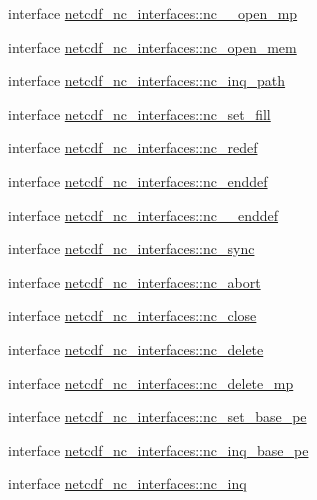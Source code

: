 \begin{DoxyCompactItemize}
\item 
interface \hyperlink{interfacenetcdf__nc__interfaces_1_1nc____open__mp}{netcdf\+\_\+nc\+\_\+interfaces\+::nc\+\_\+\+\_\+open\+\_\+mp}
\item 
interface \hyperlink{interfacenetcdf__nc__interfaces_1_1nc__open__mem}{netcdf\+\_\+nc\+\_\+interfaces\+::nc\+\_\+open\+\_\+mem}
\item 
interface \hyperlink{interfacenetcdf__nc__interfaces_1_1nc__inq__path}{netcdf\+\_\+nc\+\_\+interfaces\+::nc\+\_\+inq\+\_\+path}
\item 
interface \hyperlink{interfacenetcdf__nc__interfaces_1_1nc__set__fill}{netcdf\+\_\+nc\+\_\+interfaces\+::nc\+\_\+set\+\_\+fill}
\item 
interface \hyperlink{interfacenetcdf__nc__interfaces_1_1nc__redef}{netcdf\+\_\+nc\+\_\+interfaces\+::nc\+\_\+redef}
\item 
interface \hyperlink{interfacenetcdf__nc__interfaces_1_1nc__enddef}{netcdf\+\_\+nc\+\_\+interfaces\+::nc\+\_\+enddef}
\item 
interface \hyperlink{interfacenetcdf__nc__interfaces_1_1nc____enddef}{netcdf\+\_\+nc\+\_\+interfaces\+::nc\+\_\+\+\_\+enddef}
\item 
interface \hyperlink{interfacenetcdf__nc__interfaces_1_1nc__sync}{netcdf\+\_\+nc\+\_\+interfaces\+::nc\+\_\+sync}
\item 
interface \hyperlink{interfacenetcdf__nc__interfaces_1_1nc__abort}{netcdf\+\_\+nc\+\_\+interfaces\+::nc\+\_\+abort}
\item 
interface \hyperlink{interfacenetcdf__nc__interfaces_1_1nc__close}{netcdf\+\_\+nc\+\_\+interfaces\+::nc\+\_\+close}
\item 
interface \hyperlink{interfacenetcdf__nc__interfaces_1_1nc__delete}{netcdf\+\_\+nc\+\_\+interfaces\+::nc\+\_\+delete}
\item 
interface \hyperlink{interfacenetcdf__nc__interfaces_1_1nc__delete__mp}{netcdf\+\_\+nc\+\_\+interfaces\+::nc\+\_\+delete\+\_\+mp}
\item 
interface \hyperlink{interfacenetcdf__nc__interfaces_1_1nc__set__base__pe}{netcdf\+\_\+nc\+\_\+interfaces\+::nc\+\_\+set\+\_\+base\+\_\+pe}
\item 
interface \hyperlink{interfacenetcdf__nc__interfaces_1_1nc__inq__base__pe}{netcdf\+\_\+nc\+\_\+interfaces\+::nc\+\_\+inq\+\_\+base\+\_\+pe}
\item 
interface \hyperlink{interfacenetcdf__nc__interfaces_1_1nc__inq}{netcdf\+\_\+nc\+\_\+interfaces\+::nc\+\_\+inq}
\item 

\end{DoxyCompactItemize}

